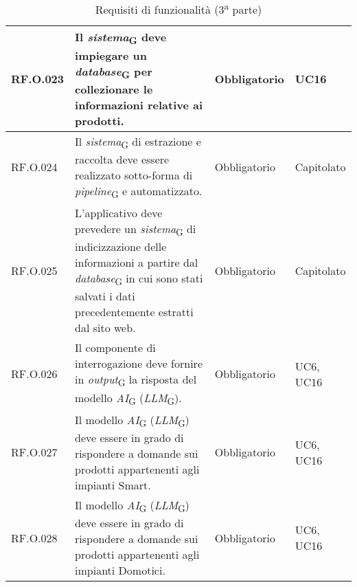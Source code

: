 \begin{table}[H]
\begin{tabular}{|C{2.7cm}|L{7.2cm}|C{2.7cm}|C{2cm}|}
        \hline
         RF.O.023 & Il \textit{sistema}\textsubscript{G} deve impiegare un \textit{database}\textsubscript{G} per collezionare le informazioni relative ai prodotti.
         & Obbligatorio & UC16 \\
        \hline
         RF.O.024 & Il \textit{sistema}\textsubscript{G} di estrazione e raccolta deve essere realizzato sotto-forma di \textit{pipeline}\textsubscript{G} e automatizzato.
         & Obbligatorio & Capitolato \\
        \hline
         RF.O.025 & L’applicativo deve prevedere un \textit{sistema}\textsubscript{G} di indicizzazione delle informazioni a partire dal
        \textit{database}\textsubscript{G} in cui sono stati salvati i dati precedentemente estratti dal sito web.
         & Obbligatorio & Capitolato \\
        \hline
        RF.O.026 & Il componente di interrogazione deve fornire in \textit{output}\textsubscript{G} la risposta del modello \textit{AI}\textsubscript{G} (\textit{LLM}\textsubscript{G}).
         & Obbligatorio & UC6, UC16 \\
        \hline
        RF.O.027 & Il modello \textit{AI}\textsubscript{G} (\textit{LLM}\textsubscript{G}) deve essere in grado di rispondere a domande sui prodotti appartenenti agli impianti Smart.
         & Obbligatorio & UC6, UC16 \\
        \hline
        RF.O.028 & Il modello \textit{AI}\textsubscript{G} (\textit{LLM}\textsubscript{G}) deve essere in grado di rispondere a domande sui prodotti appartenenti agli impianti Domotici.
         & Obbligatorio & UC6, UC16 \\
        \hline
    \end{tabular}
    \caption{Requisiti di funzionalità (3\textsuperscript{a}  parte)}
\end{table}
